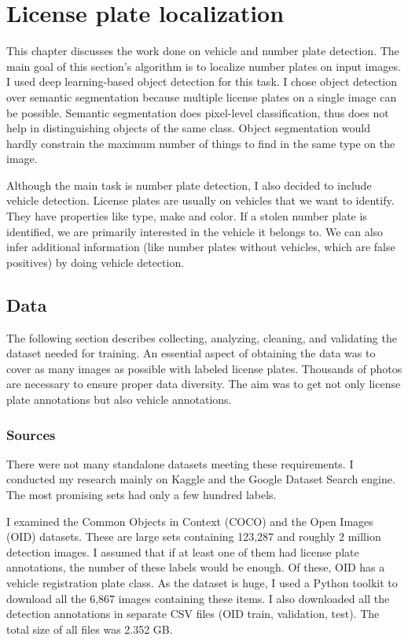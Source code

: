 \chapter{License plate localization}

This chapter discusses the work done on vehicle and number plate detection. The main goal of this section’s algorithm is to localize number plates on input images. I used deep learning-based object detection for this task. I chose object detection over semantic segmentation because multiple license plates on a single image can be possible. Semantic segmentation does pixel-level classification, thus does not help in distinguishing objects of the same class. Object segmentation would hardly constrain the maximum number of things to find in the same type on the image.

Although the main task is number plate detection, I also decided to include vehicle detection. License plates are usually on vehicles that we want to identify. They have properties like type, make and color. If a stolen number plate is identified, we are primarily interested in the vehicle it belongs to. We can also infer additional information (like number plates without vehicles, which are false positives) by doing vehicle detection.

\section{Data}

The following section describes collecting, analyzing, cleaning, and validating the dataset needed for training. An essential aspect of obtaining the data was to cover as many images as possible with labeled license plates. Thousands of photos are necessary to ensure proper data diversity. The aim was to get not only license plate annotations but also vehicle annotations.

\subsection{Sources}

There were not many standalone datasets meeting these requirements. I conducted my research mainly on Kaggle and the Google Dataset Search engine. The most promising sets had only a few hundred labels.

I examined the Common Objects in Context\cite{MS-COCO} (COCO) and the Open Images\cite{OID} (OID) datasets. These are large sets containing 123,287 and roughly 2 million detection images. I assumed that if at least one of them had license plate annotations, the number of these labels would be enough. Of these, OID has a vehicle registration plate class. As the dataset is huge, I used a Python toolkit to download all the 6,867 images containing these items. I also downloaded all the detection annotations in separate CSV files (OID train, validation, test). The total size of all files was 2.352 GB.

